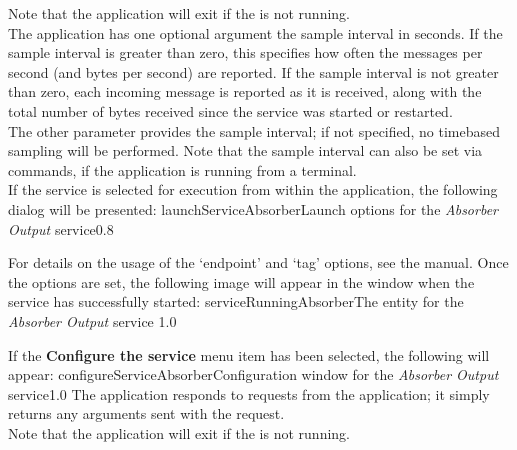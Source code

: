 Note that the application will exit if the  is not
running.\\

The application has one optional argument \longDash{} the sample interval in seconds.
If the sample interval is greater than zero, this specifies how often the messages per
second (and bytes per second) are reported.
If the sample interval is not greater than zero, each incoming message is reported as it
is received, along with the total number of bytes received since the service was started
or restarted.
\insertAppParameters
{}
\insertOutputServiceComment\\

The other parameter provides the sample interval; if not specified, no
time\longDash{}based sampling will be performed.
Note that the sample interval can also be set via commands, if the application is
running from a terminal.\\

\insertStandardServiceCommands
\condPage
If the service is selected for execution from within the \emph{\MMMU} application, the
following dialog will be presented:
%
{launchServiceAbsorber}{Launch options for the \emph{Absorber Output} service}{0.8}

For details on the usage of the `endpoint' and `tag' options, see the \emph{\MMMU} manual.
Once the options are set, the following image will appear in the \emph{\MMMU} window when
the service has successfully started:
%
{serviceRunningAbsorber}{The \emph{\MMMU} entity for the \emph{Absorber Output} service}%
{1.0}

If the \textbf{Configure the service} menu item has been selected, the following will
appear:
%
{configureServiceAbsorber}{Configuration window for the \emph{Absorber Output}
service}{1.0}
\condPage
{}
The  application responds to
 requests from the
 application; it simply returns any arguments
sent with the request.\\

Note that the application will exit if the  is not
running.\\

